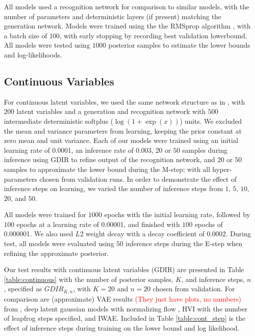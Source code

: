 \documentclass{article} %
\newcommand{\alert}[1]{\textcolor{red}{#1}}
\begin{document}
All models used a recognition network for comparison to similar models, with
the number of parameters and deterministic layers (if present) matching the
generation network. Models were trained using the the RMSprop algorithm
\citep{Hinton-Coursera2012}, with a batch size of $100$, with early stopping by
recording best validation lowerbound. All models were tested using $1000$ posterior samples
to estimate the lower bounds and log-likelihoods.

\subsection{Continuous Variables}
For continuous latent variables, we used the same network structure as in
\citep{kingma2013auto, salimans2014markov}, with $200$ latent variables and a
generation and recognition network with $500$ intermediate deterministic
softplus ($\log (1 + \exp(x))$) units. We excluded the mean and variance parameters from learning, keeping the prior constant at zero mean and unit variance.
Each of our models were trained using an initial learning
rate of \num{0.0001}, an inference rate of \num{0.003}, $20$ or $50$ samples
during inference using GDIR to refine output of the recognition network, and
$20$ or $50$ samples to approximate the lower bound during the M-step; with all
hyper-parameters chosen from validation runs. In order to demonstrate the effect
of inference steps on learning, we varied the number of inference steps from
$1$, $5$, $10$, $20$, and $50$.

All models were trained for $1000$ epochs with the initial learning rate,
followed by $100$ epochs at a learning rate of \num{0.00001}, and finished with
$100$ epochs of \num{0.000001}. We also used $L2$ weight decay with a decay
coefficient of \num{0.0002}. During test, all models were evaluated using $50$
inference steps during the E-step when refining the approximate posterior.

Our test results with continuous latent variables (GDIR) are presented in Table
\ref{table:continuous} with the number of posterior samples, $K$, and inference
steps, $n$, specified as $GDIR_{K, n}$, with $K=20$ and $n=20$ chosen from
validation. For comparison are
(approximate) VAE results \alert{(They just have plots, no numbers)} from
\citep{kingma2013auto}, deep latent gaussian models with normalizing flow
\citep[DLGM+NF,][]{rezende2015variational}, HVI with the number of leapfrog steps
specified, and IWAE. Included in Table \ref{table:cont_step} is
the effect of inference steps during training on the lower bound and log
likelihood.
\end{document}
